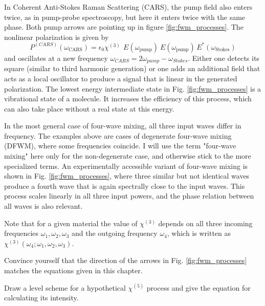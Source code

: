 In Coherent Anti-Stokes Raman Scattering (CARS), the pump field also enters twice, as in pump-probe spectroscopy, but here it enters twice with the same phase. Both pump arrows are pointing up in  figure \ref{fig:fwm_processes}. The nonlinear polarization is given by 
%
\begin{equation}
P^{(CARS)}(\omega_{\text{CARS}}) = 
\epsilon_0 \chi^{(3)} \, \ E(\omega_{\text{pump}}) \ E(\omega_{\text{pump}})  \, E^*(\omega_{\text{Stokes}}) 
\label{eq:fwm_chi3-cars}
\end{equation}
%
and oscillates at a new frequency $\omega_{CARS} = 2 \omega_{pump} - \omega_{Stokes}$. Either one detects its square (similar to third harmonic generation) or one adds an additional field that acts as a local oscillator to produce a signal that is linear in the generated polarization. The lowest energy intermediate state in Fig. \ref{fig:fwm_processes} is a vibrational state of a molecule. It increases the efficiency of this process, which can also take place without a real state at this energy. 

In the most general case of four-wave mixing, all three input waves differ in frequency. The examples above are cases of degenerate four-wave mixing (DFWM), where some frequencies coincide. I will use the term "four-wave mixing" here only for the non-degenerate case, and otherwise stick to the more specialized terms. An experimentally accessible variant of four-wave mixing is shown in Fig. \ref{fig:fwm_processes}, where three similar but not identical waves produce a fourth wave that is again spectrally close to the input waves. This process scales linearly in all three input powers, and the phase relation between all waves is also relevant.

Note that for a given material the value of $\chi^{(3)} $ depends on all three incoming frequencies $\omega_1, \omega_2, \omega_3$ and the outgoing frequency $\omega_4$, which is written as  $\chi^{(3)}(\omega_4; \omega_1, \omega_2, \omega_3)$. 

\begin{questions}
  \item Convince yourself that the direction of the arrows in  Fig. \ref{fig:fwm_processes} matches the equations given in this chapter.

  \item Draw a level scheme for a hypothetical $\chi^{(5)}$ process and give the equation for calculating its intensity.
\end{questions}


